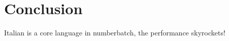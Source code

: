 
\chapter{Conclusion}%
\label{chap:conclusion}


Italian is a core language in numberbatch, the performance skyrockets!
